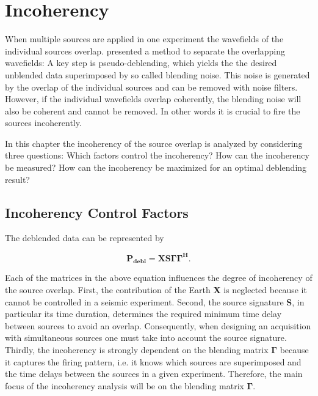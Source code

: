 \chapter{Incoherency} \label{chap::incoherency}

When multiple sources are applied in one experiment the wavefields of the individual sources overlap. \cite{Mahdad-Deblending-Method} presented a method to separate the overlapping wavefields: A key step is pseudo-deblending, which yields the the desired unblended data superimposed by so called blending noise. This noise is generated by the overlap of the individual sources and can be removed with noise filters. However, if the individual wavefields overlap coherently, the blending noise will also be coherent and cannot be removed. In other words it is crucial to fire the sources incoherently.

In this chapter the incoherency of the source overlap is analyzed by considering three questions: Which factors control the incoherency? How can the incoherency be measured? How can the incoherency be maximized for an optimal deblending result?

\section{Incoherency Control Factors}

The deblended data can be represented by

\begin{equation}
	\mathbf{ P_{debl} } = \mathbf{X S \Gamma \Gamma ^H}.
	\label{eq:Ch-Incoherency-Deblended-Data}
\end{equation} 

Each of the matrices in the above equation influences the degree of incoherency of the source overlap. First, the contribution of the Earth \textbf{X} is neglected because it cannot be controlled in a seismic experiment. Second, the source signature \textbf{S}, in particular its time duration, determines the required minimum time delay between sources to avoid an overlap. Consequently, when designing an acquisition with simultaneous sources one must take into account the source signature. Thirdly, the incoherency is strongly dependent on the blending matrix $\mathbf{\Gamma}$ because it captures the firing pattern, i.e. it knows which sources are superimposed and the time delays between the sources in a given experiment. Therefore, the main focus of the incoherency analysis will be on the blending matrix $\mathbf{\Gamma}$.

